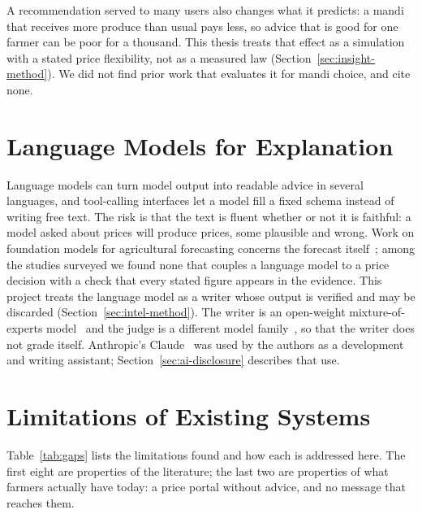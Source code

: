 A recommendation served to many users also changes what it predicts: a mandi that receives more produce than usual pays less, so advice that is good for one farmer can be poor for a thousand. This thesis treats that effect as a simulation with a stated price flexibility, not as a measured law (Section~\ref{sec:insight-method}). We did not find prior work that evaluates it for mandi choice, and cite none.

\section{Language Models for Explanation}
\label{sec:llm}

Language models can turn model output into readable advice in several languages, and tool-calling interfaces let a model fill a fixed schema instead of writing free text. The risk is that the text is fluent whether or not it is faithful: a model asked about prices will produce prices, some plausible and wrong. Work on foundation models for agricultural forecasting concerns the forecast itself~\cite{ansari2024,wang2026}; among the studies surveyed we found none that couples a language model to a price decision with a check that every stated figure appears in the evidence. This project treats the language model as a writer whose output is verified and may be discarded (Section~\ref{sec:intel-method}). The writer is an open-weight mixture-of-experts model~\cite{gptoss2025} and the judge is a different model family~\cite{qwen3}, so that the writer does not grade itself. Anthropic's Claude~\cite{claude3} was used by the authors as a development and writing assistant; Section~\ref{sec:ai-disclosure} describes that use.

\section{Limitations of Existing Systems}
\label{sec:limitations}

Table~\ref{tab:gaps} lists the limitations found and how each is addressed here. The first eight are properties of the literature; the last two are properties of what farmers actually have today: a price portal without advice, and no message that reaches them.


